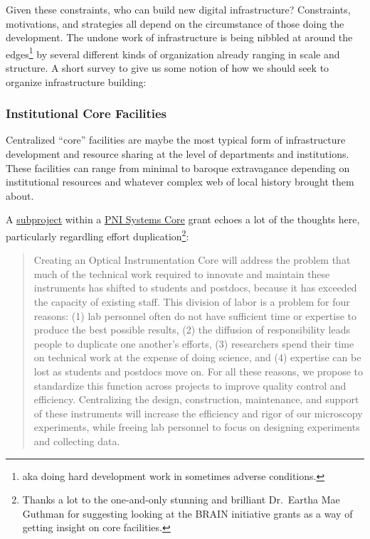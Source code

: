 \documentclass[10pt]{article}
\begin{document}
\begin{multicols}{2}
 Given these constraints, who can build new digital
infrastructure? Constraints, motivations, and strategies all depend on
the circumstance of those doing the development. The undone work of
infrastructure is being nibbled at around the edges\footnote{aka doing
  hard development work in sometimes adverse conditions.} by several
different kinds of organization already ranging in scale and structure.
A short survey to give us some notion of how we should seek to organize
infrastructure building:

\hypertarget{institutional-core-facilities}{%
\subsubsection{Institutional Core
Facilities}\label{institutional-core-facilities}}

Centralized ``core'' facilities are maybe the most typical form of
infrastructure development and resource sharing at the level of
departments and institutions. These facilities can range from minimal to
baroque extravagance depending on institutional resources and whatever
complex web of local history brought them about.

A
\href{https://reporter.nih.gov/project-details/9444124\#sub-Projects}{subproject}
within a
\href{https://projectreporter.nih.gov/project_info_details.cfm?aid=9444124}{PNI
Systems Core} grant echoes a lot of the thoughts here, particularly
regardling effort duplication\footnote{Thanks a lot to the one-and-only
  stunning and brilliant Dr.~Eartha Mae Guthman for suggesting looking
  at the BRAIN initiative grants as a way of getting insight on core
  facilities.}:

\begin{quote}
Creating an Optical Instrumentation Core will address the problem that
much of the technical work required to innovate and maintain these
instruments has shifted to students and postdocs, because it has
exceeded the capacity of existing staff. This division of labor is a
problem for four reasons: (1) lab personnel often do not have sufficient
time or expertise to produce the best possible results, (2) the
diffusion of responsibility leads people to duplicate one another's
efforts, (3) researchers spend their time on technical work at the
expense of doing science, and (4) expertise can be lost as students and
postdocs move on. For all these reasons, we propose to standardize this
function across projects to improve quality control and efficiency.
Centralizing the design, construction, maintenance, and support of these
instruments will increase the efficiency and rigor of our microscopy
experiments, while freeing lab personnel to focus on designing
experiments and collecting data.
\end{quote}


\end{multicols}
\end{document}
